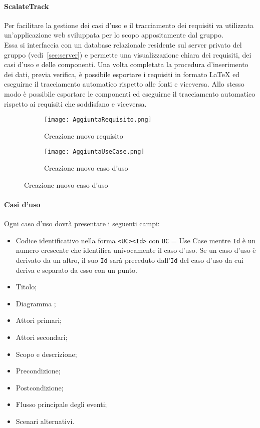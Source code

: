 \documentclass{scalatekids-article}
\begin{document}
\label{sec:front-end}

\paragraph{ScalateTrack}
\label{sec:scalatetrack}

Per facilitare la gestione dei casi d'uso e il tracciamento dei requisiti va
utilizzata un'applicazione web sviluppata per lo scopo appositamente dal
gruppo.\\Essa si interfaccia con un database relazionale residente sul server
privato del gruppo (vedi~\ref{sec:server}) e permette una visualizzazione chiara
dei requisiti, dei casi d'uso e delle componenti. Una volta completata la
procedura d'inserimento dei dati, previa verifica, è possibile esportare i
requisiti in formato \LaTeX\xspace ed eseguirne il tracciamento automatico
rispetto alle fonti e viceversa. Allo stesso modo è possibile esportare le
componenti ed eseguirne il tracciamento automatico rispetto ai requisiti
che soddisfano e viceversa.

\begin{figure}[H]
  \begin{subfigure}[H]{0.47\textwidth}
    \centering
    \texttt{[image: AggiuntaRequisito.png]}
    \caption{Creazione nuovo requisito}
  \end{subfigure}
  \qquad
  \begin{subfigure}[H]{0.47\textwidth}
    \centering
    \texttt{[image: AggiuntaUseCase.png]}
    \caption{Creazione nuovo caso d'uso}
  \end{subfigure}
\end{figure}

\paragraph{Casi d'uso}

Ogni caso d'uso dovrà presentare i seguenti campi:
\begin{itemize}
\item Codice identificativo nella forma \verb=<UC><Id>= con \verb=UC= = Use
  Case mentre \verb=Id= è un numero crescente che identifica univocamente il
  caso d'uso. Se un caso d'uso è derivato da un altro, il suo \verb=Id= sarà
  preceduto dall'\verb=Id= del caso d'uso da cui deriva e separato da esso con un
  punto.
\item Titolo;
\item Diagramma ;
\item Attori primari;
\item Attori secondari;
\item Scopo e descrizione;
\item Precondizione;
\item Postcondizione;
\item Flusso principale degli eventi;
\item Scenari alternativi.
\end{itemize}
\end{document}
